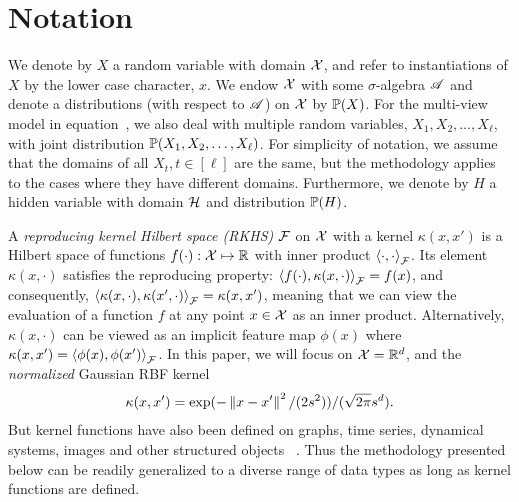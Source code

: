 \documentclass{article}
\begin{document}
\vspace{-3mm}
\section{Notation}
\vspace{-2mm}

We  denote by $X$ a random variable with domain $\mathcal{X}$,
and refer to instantiations of $X$ by the lower case character, $x$.
We endow $\mathcal{X}$ with some $\sigma$-algebra $\mathscr{A}$ and denote a distributions (with respect to $\mathscr{A}$) on $\mathcal{X}$ by $\mathbb{P}(X)$. For the multi-view model in equation~, we also deal with multiple random variables, $X_1, X_2, \ldots, X_{\ell}$, with joint distribution $\mathbb{P}(X_1,X_2,\ldots,X_{\ell})$. For simplicity of notation, we assume that the domains of all $X_t, t \in [\ell]$ are the same, but the methodology applies to the cases where they have different domains. Furthermore, we denote by $H$ a hidden variable with domain $\mathcal{H}$ and distribution $\mathbb{P}(H)$.

A \emph{reproducing kernel Hilbert space (RKHS)} $\mathcal{F}$ on $\mathcal{X}$ with a kernel $\kappa(x,x')$ is a Hilbert space of
functions $f(\cdot):\mathcal{X} \mapsto \mathbb{R}$ with inner product $\left\langle \cdot,\cdot \right\rangle_{\mathcal{F}}$. Its element $\kappa(x,\cdot)$ satisfies the reproducing property:
$\left\langle f(\cdot),\kappa(x, \cdot) \right\rangle_{\mathcal{F}} = f(x)$, and consequently, $\left\langle \kappa(x,\cdot),\kappa(x', \cdot) \right\rangle_{\mathcal{F}} = \kappa(x,x')$,
meaning that we can view the evaluation of a function $f$ at any point $x\in\mathcal{X}$ as an inner product. Alternatively, $\kappa(x,\cdot)$ can  be viewed as an implicit feature map $\phi(x)$ where $\kappa(x,x')=\left\langle \phi(x),\phi(x') \right\rangle_{\mathcal{F}}$.
In this paper, we will focus on $\mathcal{X}=\mathbb{R}^d$, and the \emph{normalized} Gaussian RBF kernel
\begin{align}
\kappa(x,x') = \exp(- \left\|x-x'\right\|^2 / (2 s^2)) / (\sqrt{2\pi} s^d). \label{eq:normalizedrbf}
\end{align}
But kernel functions have also been defined on
graphs, time series, dynamical systems, images and other structured
objects \, \cite{SchTsuVer04}. Thus the methodology presented below can be readily generalized to a diverse range of data types as long as kernel functions are defined.
\end{document}

